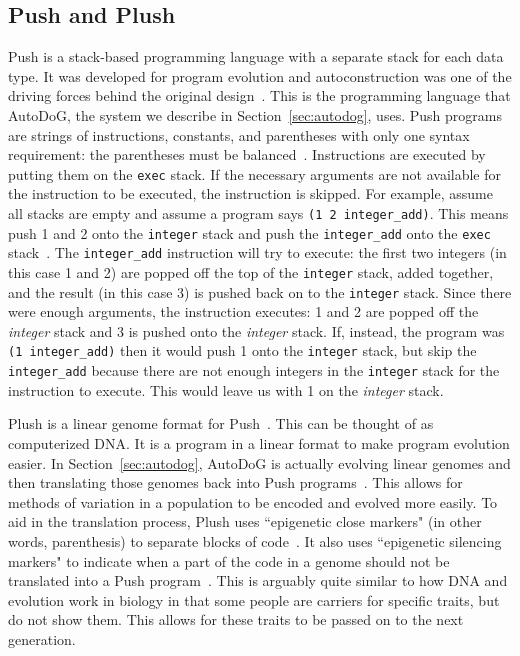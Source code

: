 \documentclass{sig-alternate}
\begin{document}
\subsection{Push and Plush}
\label{sec:push}
Push is a stack-based programming language with a separate stack for each data type. It was developed for program evolution and autoconstruction was one of the driving forces behind the original design~\cite{spector:2016}. This is the programming language that AutoDoG, the system we describe in Section~\ref{sec:autodog}, uses. Push programs are strings of instructions, constants, and parentheses with only one syntax requirement: the parentheses must be balanced~\cite{lee:2001}. Instructions are executed by putting them on the \texttt{exec} stack. If the necessary arguments are not available for the instruction to be executed, the instruction is skipped. For example, assume all stacks are empty and assume a program says \texttt{(1 2 integer\_add)}. This means push 1 and 2 onto the \texttt{integer} stack and push the \texttt{integer\_add} onto the \texttt{exec} stack~\cite{lee:tutorial}. The \texttt{integer\_add} instruction will try to execute: the first two integers (in this case 1 and 2)  are popped off the top of the \texttt{integer} stack, added together, and the result (in this case 3) is pushed back on to the \texttt{integer} stack. Since there were enough arguments, the instruction executes: 1 and 2 are popped off the \textit{integer} stack and 3 is pushed onto the \textit{integer} stack. If, instead, the program was \texttt{(1 integer\_add)} then it would push 1 onto the \texttt{integer} stack, but skip the \texttt{integer\_add} because there are not enough integers in the \texttt{integer} stack for the instruction to execute. This would leave us with 1 on the \textit{integer} stack.

Plush is a linear genome format for Push~\cite{spector:2016}. This can be thought of as computerized DNA. It is a program in a linear format to make program evolution easier.
In Section~\ref{sec:autodog}, AutoDoG is actually evolving linear genomes and then translating those genomes back into Push programs~\cite{spector:2016}. This allows for methods of variation in a population to be encoded and evolved more easily. To aid in the translation process, Plush uses ``epigenetic close markers" (in other words, parenthesis) to separate blocks of code~\cite{spector:2016}. It also uses ``epigenetic silencing markers" to indicate when a part of the code in a genome should not be translated into a Push program~\cite{spector:2016}. This is arguably quite similar to how DNA and evolution work in biology in that some people are carriers for specific traits, but do not show them. This allows for these traits to be passed on to the next generation.
\end{document}
